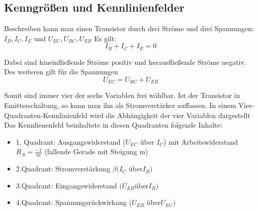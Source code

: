 \documentclass{article}
\begin{document}
\subsection{Kenngrößen und Kennlinienfelder}
Beschreiben kann man einen Transistor durch drei Ströme und drei Spannungen: \(I_B,I_C,I_E\) und \(U_{EC},U_{BC},U_{EB}\)
Es gilt:
\begin{equation}
I_B+I_C+I_E=0
\end{equation}

Dabei sind hineinfließende Ströme positiv und herausfließende Ströme negativ.\\
Des weiteren gilt für die Spannungen
\begin{equation}
U_{EC}=U_{BC}+U_{EB}
\end{equation}

Somit sind immer vier der sechs Variablen frei wählbar.
Ist der Transistor in Emitterschaltung, so kann man ihn als Stromverstärker auffassen. In einem Vier-Quadranten-Kennlinienfeld wird die Abhängigkeit der vier Variablen dargestellt\\

Das Kennlienenfeld beinhaltete in diesen Quadranten folgende Inhalte:\\
\begin{itemize}
\item 1. Quadrant: Ausgangswiderstand ($U_{EC}$ über $I_C$) mit Arbeitswiderstand $R_A = \frac{-1}{m}$ (fallende Gerade mit Steigung m)
\item 2.Quadrant: Stromverstärkung $\beta  (I_C$ über$ I_B)$
\item 3.Quadrant: Eingangswiderstand $(U_{EB} $über$ I_B)$
\item 4.Quadrant: Spannungsrückwirkung $(U_{EB}$ über$ U_{EC})$ 
\end{itemize}

\begin{center}
\begin{minipage}{\linewidth}
\centering
{}
%
\label{kennlinienfeld}
\end{minipage}
\end{center}
\end{document}

